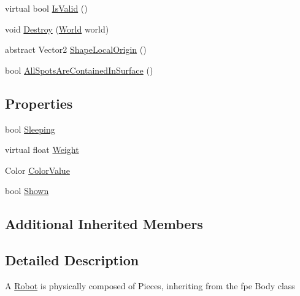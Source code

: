 \begin{DoxyCompactItemize}
\item 
virtual bool \hyperlink{classgearit_1_1src_1_1robot_1_1_piece_a681c42311965842c33374dcce7023e07}{Is\+Valid} ()
\item 
void \hyperlink{classgearit_1_1src_1_1robot_1_1_piece_ac088c3e9dcb9882e880d6e910ead101d}{Destroy} (\hyperlink{class_farseer_physics_1_1_dynamics_1_1_world}{World} world)
\item 
abstract Vector2 \hyperlink{classgearit_1_1src_1_1robot_1_1_piece_ab921691e385a02bfcdb99af25f276260}{Shape\+Local\+Origin} ()
\item 
bool \hyperlink{classgearit_1_1src_1_1robot_1_1_piece_a969fdc25f07ef2b1fc15aa360a157efd}{All\+Spots\+Are\+Contained\+In\+Surface} ()
\end{DoxyCompactItemize}
\subsection*{Properties}
\begin{DoxyCompactItemize}
\item 
bool \hyperlink{classgearit_1_1src_1_1robot_1_1_piece_a22837d8d8ce49065a18a64df4397641d}{Sleeping}
\item 
virtual float \hyperlink{classgearit_1_1src_1_1robot_1_1_piece_a296326e78b47f09749230b97d8a00b6c}{Weight}
\item 
Color \hyperlink{classgearit_1_1src_1_1robot_1_1_piece_a4600408118052b88110902c3386d4255}{Color\+Value}
\item 
bool \hyperlink{classgearit_1_1src_1_1robot_1_1_piece_a7f04d7c15839af2c999187e7b7fdd278}{Shown}
\end{DoxyCompactItemize}
\subsection*{Additional Inherited Members}


\subsection{Detailed Description}
A \hyperlink{classgearit_1_1src_1_1robot_1_1_robot}{Robot} is physically composed of Pieces, inheriting from the fpe Body class 



